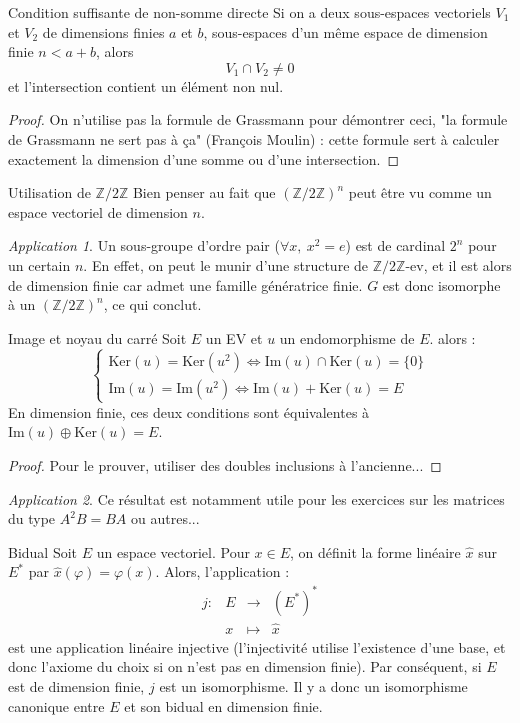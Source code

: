 \documentclass[french]{book}
\newcommand{\Z}{\mathbb{Z}}
\newcommand{\st}{^*}
\theoremstyle{plain}
\theoremstyle{definition}
\theoremstyle{remark}
\newtheorem*{app}{Application}
\begin{document}
\begin{AS}{Condition suffisante de non-somme directe} Si on a deux sous-espaces vectoriels $V_1$ et $V_2$ de dimensions finies $a$ et $b$, sous-espaces d’un même espace de dimension finie $n<a+b$, alors $$V_1\cap V_2 \ne{0}$$ et
l'intersection contient un élément non nul.
\end{AS}
\begin{proof}
	On n'utilise pas la formule de Grassmann pour démontrer ceci, "la formule de Grassmann ne sert pas à ça" (François Moulin) : cette formule sert à calculer exactement la dimension d'une somme ou d'une intersection.
\end{proof}
\begin{AS}{Utilisation de $\Z/2\Z$} Bien penser au fait que $(\Z/2\Z)^n$ peut être vu comme un espace vectoriel de dimension $n$.
\end{AS}
\begin{app}
	Un sous-groupe d'ordre pair ($\forall x,\ x^2=e$) est de cardinal $2^n$ pour un certain $n$. En effet, on peut le munir d'une structure de $\Z/2\Z$-ev, et il est alors de dimension finie car admet une famille génératrice finie. $G$ est donc isomorphe à un $(\Z/2\Z)^n$, ce qui conclut.
\end{app}
\begin{AS}{Image et noyau du carré} Soit $E$ un EV et $u$ un endomorphisme de $E$. alors : $$\begin{cases}
	\text{Ker}(u)=\text{Ker}(u^2)\iff\text{Im}(u)\cap\text{Ker}(u)=\{0\}\\
	\text{Im}(u)=\text{Im}(u^2)\iff \text{Im}(u)+\text{Ker}(u)=E
\end{cases}$$ En dimension finie, ces deux conditions sont équivalentes à $\text{Im}(u)\oplus\text{Ker}(u)=E$.
\end{AS}
\begin{proof}
	Pour le prouver, utiliser des doubles inclusions à l'ancienne...
\end{proof}
\begin{app}
	Ce résultat est notamment utile pour les exercices sur les matrices
	du type $A^2B=BA$ ou autres...
\end{app}
\begin{AS}{Bidual} Soit $E$ un espace vectoriel. Pour $x\in E$, on définit la forme linéaire $\hat{x}$ sur $E\st$ par $\hat{x}(\varphi)=\varphi(x)$. Alors, l'application :
$$ \begin{array}{lrcl}
	j:&E&\longrightarrow&(E\st)\st \\
	&x&\longmapsto&\hat{x}
\end{array}$$ est une application linéaire injective (l'injectivité utilise l'existence d'une base, et donc l'axiome du choix si on n'est pas en dimension finie). Par conséquent, si $E$ est de dimension finie, $j$ est un isomorphisme. Il y a donc un isomorphisme canonique entre $E$ et son bidual en dimension finie.
\end{AS}
\end{document}
